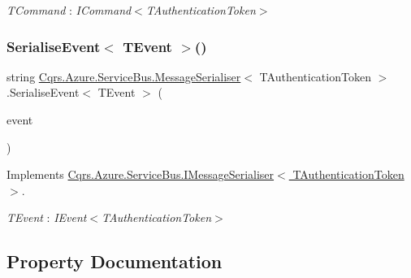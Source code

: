 \begin{Desc}
\item[Type Constraints]\begin{description}
\item[{\em T\+Command} : {\em I\+Command$<$T\+Authentication\+Token$>$}]\end{description}
\end{Desc}
\mbox{\label{classCqrs_1_1Azure_1_1ServiceBus_1_1MessageSerialiser_a596224ec927c673958e72a2153931c09_a596224ec927c673958e72a2153931c09}} 
\subsubsection{\texorpdfstring{Serialise\+Event$<$ T\+Event $>$()}{SerialiseEvent< TEvent >()}}
{\footnotesize\ttfamily string \hyperlink{classCqrs_1_1Azure_1_1ServiceBus_1_1MessageSerialiser}{Cqrs.\+Azure.\+Service\+Bus.\+Message\+Serialiser}$<$ T\+Authentication\+Token $>$.Serialise\+Event$<$ T\+Event $>$ (\begin{DoxyParamCaption}\item[{T\+Event @}]{event }\end{DoxyParamCaption})}



Implements \hyperlink{interfaceCqrs_1_1Azure_1_1ServiceBus_1_1IMessageSerialiser_af6e1bca15164a08308969794b089c31b_af6e1bca15164a08308969794b089c31b}{Cqrs.\+Azure.\+Service\+Bus.\+I\+Message\+Serialiser$<$ T\+Authentication\+Token $>$}.

\begin{Desc}
\item[Type Constraints]\begin{description}
\item[{\em T\+Event} : {\em I\+Event$<$T\+Authentication\+Token$>$}]\end{description}
\end{Desc}


\subsection{Property Documentation}
\mbox{\label{classCqrs_1_1Azure_1_1ServiceBus_1_1MessageSerialiser_a71ebae2d4d6352b19b49bd0115b99fcf_a71ebae2d4d6352b19b49bd0115b99fcf}} 
